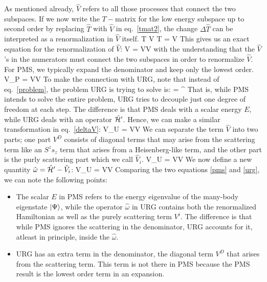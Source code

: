 \documentclass[14pt]{extarticle}
\numberwithin{equation}{section}
\begin{document}
\eeq
As mentioned already, \(\hat V\) refers to all those processes that connect the two subspaces. If we now write the \(T-\)matrix for the low energy subspace up to second order by replacing \(\hat T\) with \(\hat V\) in eq.~\ref{tmat2}, the change \(\Delta \hat T\) can be interpreted as a renormalization in \(\hat V\) itself.
\beq
\hat T \to \hat V \implies \Delta \hat T = \Delta \hat V
\eeq
This gives us an exact equation for the renormalization of \(\hat V\):
\beq[deltaV]
\Delta \hat V = \hat V\hat V
\eeq
with the understanding that the \(\hat V\)'s in the numerators must connect the two subspaces in order to renormalize \(\hat V\).
For PMS, we typically expand the denominator and keep only the lowest order.
\beq[pms]
\Delta \hat V_{P} = \hat V\hat V
\eeq
To make the connection with URG, note that instead of eq.~\ref{problem}, the problem URG is trying to solve is:
\beq
\hat\ham\ket{\Psi} = \hat\ham^\prime \ket{\Psi}
\eeq
That is, while PMS intends to solve the entire problem, URG tries to decouple just one degree of freedom at each step. The difference is that PMS deals with a scalar energy \(E\), while URG deals with an operator \(\hat{\mathcal{H}}^\prime\). Hence, we can make a similar transformation in eq.~\ref{deltaV}:
\beq
\Delta \hat V_{U} = \hat V\hat V
\eeq
We can separate the term \(\hat V\) into two parts; one part \(V^D\) consists of diagonal terms that may arise from the scattering term like an \(S^z s_z\) term that arises from a Heisenberg-like term, and the other part is the purly scattering part which we call \(\hat V_i\).
\beq
\Delta \hat V_{U} = \hat V\hat V
\eeq
We now define a new quantity \(\hat \omega = \hat{\mathcal{H}}^\prime - \hat V_i\):
\beq[urg]
\Delta \hat V_{U} = \hat V\hat V
\eeq
	Comparing the two equations \ref{pms} and \ref{urg}, we can note the following points:
\begin{itemize}
	\item The scalar \(E\) in PMS refers to the energy eigenvalue of the many-body eigenstate \(\ket{\Psi}\), while the operator \(\hat \omega\) in URG contains both the renormalized Hamiltonian as well as the purely scattering term \(V^i\). The difference is that while PMS ignores the scattering in the denominator, URG accounts for it, atleast in principle, inside the \(\hat \omega\).
	\item URG has an extra term in the denominator, the diagonal term \(V^D\) that arises from the scattering term. This term is not there in PMS because the PMS result is the lowest order term in an expansion.
\end{itemize}
\end{document}
